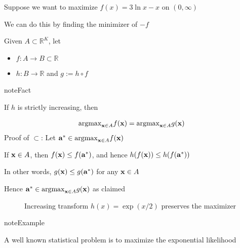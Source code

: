 \documentclass[letterpaper,10pt,english]{jupyterBook}
\begin{document}
\sphinxAtStartPar
Suppose we want to maximize \(f(x) = 3 \ln x - x\) on \((0, \infty)\)

\sphinxAtStartPar
We can do this by finding the minimizer of \(-f\)



\sphinxAtStartPar
Given \(A \subset \mathbb{R}^K\), let
\begin{itemize}
\item {} 
\sphinxAtStartPar
\(f \colon A \to B \subset \mathbb{R}\)

\item {} 
\sphinxAtStartPar
\(h \colon B \to \mathbb{R}\) and \(g := h \circ f\)

\end{itemize}

\begin{sphinxadmonition}{note}{Fact}

\sphinxAtStartPar
If \(h\) is strictly increasing, then
\end{sphinxadmonition}
\begin{equation*}
\begin{split}\mathrm{argmax}_{{\bf x} \in A}f({\bf x}) =\mathrm{argmax}_{{\bf x} \in A}g({\bf x})\end{split}
\end{equation*}
\sphinxAtStartPar
Proof of \(\subset\): Let \({\bf a}^* \in \mathrm{argmax}_{{\bf x} \in A}f({\bf x})\)

\sphinxAtStartPar
If \({\bf x} \in A\), then \(f({\bf x}) \leq f({\bf a}^*)\), and hence \(h(f({\bf x})) \leq h(f({\bf a}^*)) \quad\)

\sphinxAtStartPar
In other words, \(g({\bf x}) \leq g({\bf a}^*)\) for any \({\bf x} \in A\)

\sphinxAtStartPar
Hence \({\bf a}^* \in \mathrm{argmax}_{{\bf x} \in A} g({\bf x})\) as claimed

\begin{figure}[htbp]
\centering
\capstart

\noindent{}
\caption{Increasing transform \(h(x) = \exp(x/2)\) preserves the maximizer}\label{\detokenize{06.optimization_fundamentals:id9}}\end{figure}

\begin{sphinxadmonition}{note}{Example}

\sphinxAtStartPar
A well known statistical problem is to maximize the exponential likelihood
\end{sphinxadmonition}
\end{document}
